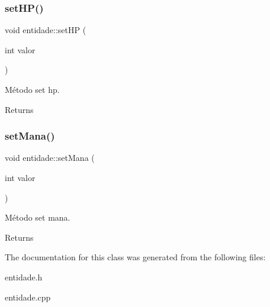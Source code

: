 \subsubsection{\texorpdfstring{set\+H\+P()}{setHP()}}
{\footnotesize\ttfamily void entidade\+::set\+HP (\begin{DoxyParamCaption}\item[{int}]{valor }\end{DoxyParamCaption})}



Método set hp. 

\begin{DoxyReturn}{Returns}

\end{DoxyReturn}
\mbox{\label{classentidade_acc3d424b1cdad2cc19c03cc0bff4cce6}} 
\subsubsection{\texorpdfstring{set\+Mana()}{setMana()}}
{\footnotesize\ttfamily void entidade\+::set\+Mana (\begin{DoxyParamCaption}\item[{int}]{valor }\end{DoxyParamCaption})}



Método set mana. 

\begin{DoxyReturn}{Returns}

\end{DoxyReturn}


The documentation for this class was generated from the following files\+:\begin{DoxyCompactItemize}
\item 
entidade.\+h\item 
entidade.\+cpp\end{DoxyCompactItemize}
